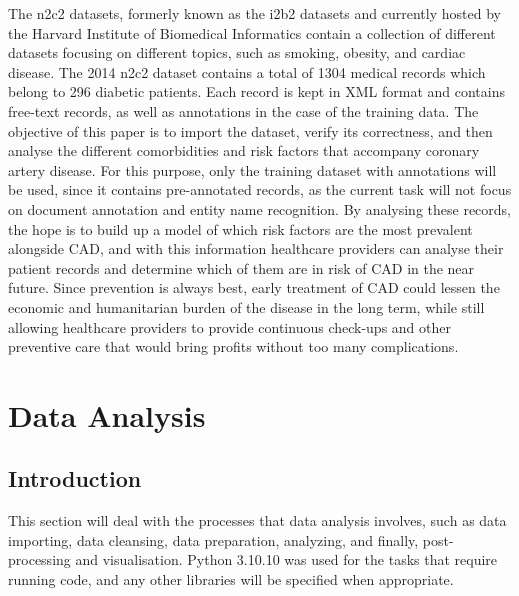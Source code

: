\documentclass[a4paper,12pt]{article}
\begin{document}
The n2c2 datasets, formerly known as the i2b2 datasets and currently hosted by
the Harvard Institute of Biomedical Informatics \parencite{Kumar2015} contain
a collection of different datasets focusing on different topics, such as
smoking, obesity, and cardiac disease.
The 2014 n2c2 dataset contains a total of 1304 medical records which belong to
296 diabetic patients.
Each record is kept in XML format and contains free-text records, as well as
annotations in the case of the training data.
The objective of this paper is to import the dataset, verify its correctness,
and then analyse the different comorbidities and risk factors that accompany
coronary artery disease.
For this purpose, only the training dataset with annotations will be used,
since it contains pre-annotated records, as the current task will not focus on
document annotation and entity name recognition.
By analysing these records, the hope is to build up a model of which risk
factors are the most prevalent alongside CAD, and with this information
healthcare providers can analyse their patient records and determine which
of them are in risk of CAD in the near future.
Since prevention is always best, early treatment of CAD could lessen the
economic and humanitarian burden of the disease in the long term, while
still allowing healthcare providers to provide continuous check-ups and
other preventive care that would bring profits without too many complications.

\section{Data Analysis}

\subsection{Introduction}

This section will deal with the processes that data analysis involves, such as
data importing, data cleansing, data preparation, analyzing, and finally,
post-processing and visualisation.
Python 3.10.10 was used for the tasks that require running code, and any other
libraries will be specified when appropriate.
\end{document}

